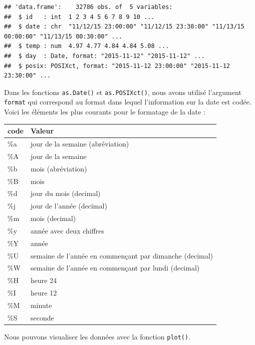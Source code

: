 \documentclass[
]{book}
\newenvironment{Shaded}{\begin{snugshade}}{\end{snugshade}}
\newcommand{\CommentTok}[1]{\textcolor[rgb]{0.56,0.35,0.01}{\textit{#1}}}
\newcommand{\DataTypeTok}[1]{\textcolor[rgb]{0.13,0.29,0.53}{#1}}
\newcommand{\DecValTok}[1]{\textcolor[rgb]{0.00,0.00,0.81}{#1}}
\newcommand{\KeywordTok}[1]{\textcolor[rgb]{0.13,0.29,0.53}{\textbf{#1}}}
\newcommand{\NormalTok}[1]{#1}
\newcommand{\OperatorTok}[1]{\textcolor[rgb]{0.81,0.36,0.00}{\textbf{#1}}}
\newcommand{\StringTok}[1]{\textcolor[rgb]{0.31,0.60,0.02}{#1}}
\begin{document}
\begin{verbatim}
## 'data.frame':    32786 obs. of  5 variables:
##  $ id   : int  1 2 3 4 5 6 7 8 9 10 ...
##  $ date : chr  "11/12/15 23:00:00" "11/12/15 23:30:00" "11/13/15 00:00:00" "11/13/15 00:30:00" ...
##  $ temp : num  4.97 4.77 4.84 4.84 5.08 ...
##  $ day  : Date, format: "2015-11-12" "2015-11-12" ...
##  $ posix: POSIXct, format: "2015-11-12 23:00:00" "2015-11-12 23:30:00" ...
\end{verbatim}

Dans les fonctions \texttt{as.Date()} et \texttt{as.POSIXct()}, nous avons utilisé l'argument \texttt{format} qui correspond au format dans lequel l'information sur la date est codée. Voici les éléments les plus courants pour le formatage de la date :

\begin{longtable}[]{@{}ll@{}}
\toprule
code & Valeur\tabularnewline
\midrule
\endhead
\%a & jour de la semaine (abréviation)\tabularnewline
\%A & jour de la semaine\tabularnewline
\%b & mois (abréviation)\tabularnewline
\%B & mois\tabularnewline
\%d & jour du mois (decimal)\tabularnewline
\%j & jour de l'année (decimal)\tabularnewline
\%m & mois (decimal)\tabularnewline
\%y & année avec deux chiffres\tabularnewline
\%Y & année\tabularnewline
\%U & semaine de l'année en commençant par dimanche (decimal)\tabularnewline
\%W & semaine de l'année en commençant par lundi (decimal)\tabularnewline
\%H & heure 24\tabularnewline
\%I & heure 12\tabularnewline
\%M & minute\tabularnewline
\%S & seconde\tabularnewline
\bottomrule
\end{longtable}

Nous pouvons visualiser les données avec la fonction \texttt{plot()}.

\begin{Shaded}
\end{Shaded}
\end{document}
